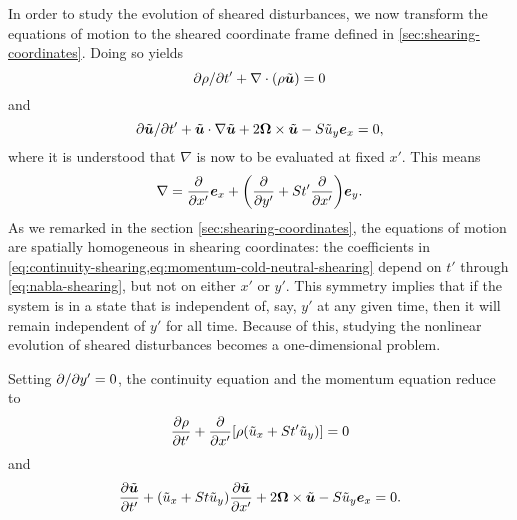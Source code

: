 \documentclass[aps,pre,notitlepage,amsmath,amssymb,amsfonts,nobibnotes,nofootinbib,superscriptaddress,onecolumn,a4paper,10pt]{revtex4-1}
\newcommand{\tvec}[1]{\tilde{\vec{#1}}}
\begin{document}
In order to study the evolution of sheared disturbances, we now transform the
equations of motion to the sheared coordinate frame defined in
\cref{sec:shearing-coordinates}. Doing so yields
\begin{equation}
  \label{eq:continuity-shearing}
  \pader{\rho}{t'} + \nabla\cdot(\rho\tvec{u}) = 0
\end{equation}
and
\begin{equation}
  \label{eq:momentum-cold-neutral-shearing}
  \pader{\tvec{u}}{t'} + \tvec{u}\cdot\nabla\tvec{u}
  + 2\vec{\Omega}\times\tvec{u} - S\tilde{u}_y\ex = 0,
\end{equation}
where it is understood that $\nabla$ is now to be evaluated at fixed $x'$.
This means
\begin{equation}
  \label{eq:nabla-shearing}
  \nabla = \pder{}{x'}\ex + \left(\pder{}{y'} + St'\pder{}{x'}\right)\ey.
\end{equation}
As we remarked in the section \cref{sec:shearing-coordinates}, the equations
of motion are spatially homogeneous in shearing coordinates: the coefficients
in \cref{eq:continuity-shearing,eq:momentum-cold-neutral-shearing} depend on
$t'$ through \cref{eq:nabla-shearing}, but not on either $x'$ or $y'$. This
symmetry implies that if the system is in a state that is independent of, say,
$y'$ at any given time, then it will remain independent of $y'$ for all time.
Because of this, studying the nonlinear evolution of sheared disturbances
becomes a one-dimensional problem.

Setting $\partial{}/\partial{y'}=0$, the continuity equation
 and the momentum equation
 reduce to
\begin{equation}
  \frac{\partial\rho}{\partial t'} + \frac{\partial}{\partial x'}[\rho(\tilde{u}_x + St'\tilde{u}_y)] = 0
\end{equation}
and
\begin{equation}
  \pder{\tvec{u}}{t'} + (\tilde{u}_x + St\tilde{u}_y)\pder{\tvec{u}}{x'}
  + 2\vec{\Omega}\times\tvec{u} - S\tilde{u}_y\ex = 0.
\end{equation}


\end{document}
